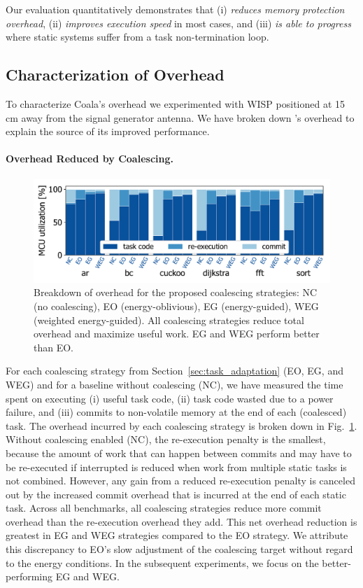 Our evaluation quantitatively demonstrates that \sys (i) \emph{reduces memory
protection overhead}, (ii) \emph{improves execution speed} in most cases,
and (iii) \emph{is able to progress} where static systems suffer from a task non-termination loop. 
%
\subsection{Characterization of Overhead}
\label{sec:coala_overhead}

To characterize Coala's overhead we experimented with WISP positioned at
15\,cm away from the signal generator antenna.
We have broken down \sys's overhead to explain the source of its improved performance.

\paragraph{Overhead Reduced by Coalescing.}
\label{sec:overhead-coalescing}

\begin{figure}
    \centering
    \includegraphics[width=.8\columnwidth]{figures/coalEfficiency}
    \caption{Breakdown of overhead for the proposed coalescing strategies:
    NC (no coalescing), EO (energy-oblivious), EG (energy-guided), WEG
    (weighted energy-guided). All coalescing strategies reduce total
    overhead and maximize useful work. EG and WEG perform better than EO.}
    \label{fig:overallOverheadBreakdown}
\end{figure}

For each coalescing strategy from Section~\ref{sec:task_adaptation} (EO, EG,
and WEG) and for a baseline without coalescing (NC), we have measured the time
spent on executing (i) useful task code, (ii) task code wasted due to a power failure, and
(iii) commits to non-volatile memory at the end of each (coalesced)
task.
%
The overhead incurred by each coalescing strategy is broken down in
Fig.~\ref{fig:overallOverheadBreakdown}. Without coalescing enabled (NC), the
re-execution penalty is the smallest, because the amount of work that can happen
between commits and may have to be re-executed if interrupted is reduced when
work from multiple static tasks is not combined.
%
However, any gain from a reduced re-execution penalty is canceled out by
the increased commit overhead that is incurred at the end of each static
task.
%
Across all benchmarks, all coalescing strategies reduce more commit overhead
than the re-execution overhead they add.
%
This net overhead reduction is greatest in EG and WEG strategies compared
to the EO strategy. We attribute this discrepancy to EO's slow adjustment
of the coalescing target without regard to the energy conditions.
%
In the subsequent experiments, we focus on the better-performing EG and WEG.

